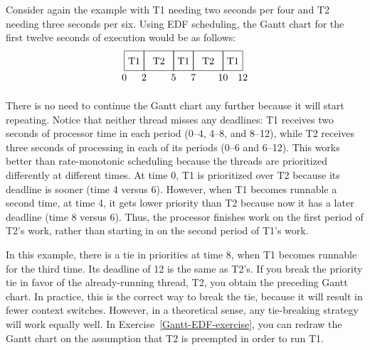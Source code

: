 Consider again the example with T1 needing two seconds per four and T2 needing three
seconds per six.
Using EDF scheduling, the Gantt chart for the first twelve seconds of
execution would be as follows:
\[\begin{tikzpicture}[scale=.035]
\draw (0,0) rectangle (20,20);
\draw (20,0) rectangle (50,20);
\draw (50,0) rectangle (70,20);
\draw (70,0) rectangle (100,20);
\draw (100,0) rectangle (120,20);
\draw (10,10) node{T1};
\draw (35,10) node{T2};
\draw (60,10) node{T1};
\draw (85,10) node{T2};
\draw (110,10) node{T1};
\draw (0,-7) node{0};
\draw (20,-7) node{2};
\draw (50,-7) node{5};
\draw (70,-7) node{7};
\draw (100,-7) node{10};
\draw (120,-7) node{12};
\end{tikzpicture}\]

There is no need to continue the Gantt chart any further because it
will start repeating.  Notice that neither thread misses any
deadlines: T1 receives two seconds of processor time in each period
(0--4, 4--8, and 8--12), while T2 receives three seconds of processing in
each of its periods (0--6 and 6--12).  This works better
than rate-monotonic scheduling because the threads are prioritized
differently at different times.  At time 0, T1 is prioritized over T2
because its deadline is sooner (time 4 versus 6).  However, when T1
becomes runnable a second time, at time 4, it gets lower priority than
T2 because now it has a later deadline (time 8 versus 6).  Thus, the processor
finishes work on the first period of T2's work, rather than starting in
on the second period of T1's work.

In this example, there is a tie in priorities at time 8, when T1
becomes runnable for the third time.  Its deadline of 12 is the same
as T2's.  If you break the priority tie in favor of the
already-running thread, T2, you obtain the preceding Gantt chart.  In
practice, this is the correct way to break the tie, because it will result
in fewer context switches.  However, in a theoretical sense, any
tie-breaking strategy will work equally well.  In Exercise~\ref{Gantt-EDF-exercise}, you can
redraw the Gantt chart on the assumption that T2 is preempted in order
to run T1.

